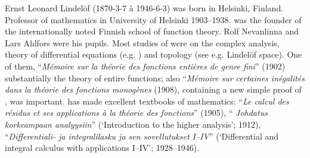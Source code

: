 \documentclass[12pt]{article}
\theoremstyle{definition}
\begin{document}
Ernst Leonard Lindel\"of (1870-3-7 \`a 1946-6-3) was born in 
Helsinki, Finland.  Professor of mathematics in University of 
Helsinki 1903--1938.   was the 
founder of the internationally noted Finnish school of function 
theory.  Rolf Nevanlinna and Lars Ahlfors were his pupils.  Most 
studies of  were on the complex 
analysis, theory of differential equations (e.g. 
) and 
topology (see e.g. Lindel\"of space).  One of them, 
``{\em M\'emoire sur la th\'eorie des fonctions enti\`eres de 
genre fini}'' (1902)  
substantially the theory of entire functions; also 
``{\em M\'emoire sur certaines in\'egalit\'es dans la th\'eorie 
des fonctions monog\`enes} (1908), containing a new simple 
proof of , was 
important.   has made excellent 
textbooks of mathematics: ``{\em Le calcul des r\'esidus et ses 
applications \`a la th\'eorie des fonctions}'' (1905), ``{\em  
Johdatus korkeampaan analyysiin}'' (`Introduction to the higher 
analysis'; 1912), ``{\em Differentiali- ja integralilasku ja 
sen sovellutukset I--IV}'' (`Differential and integral calculus 
with applications I--IV'; 1928--1946). 

\end{document}
